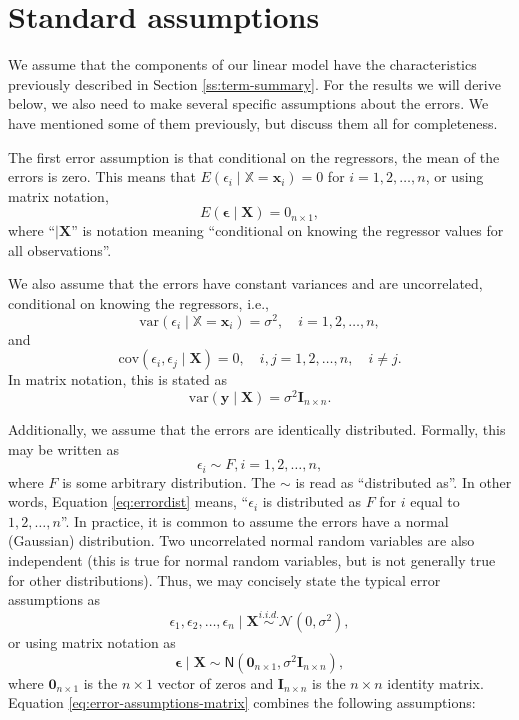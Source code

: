 \documentclass[
]{book}
\theoremstyle{definition}
\theoremstyle{definition}
\theoremstyle{definition}
\theoremstyle{definition}
\theoremstyle{remark}
\begin{document}
\hypertarget{standard-assumptions}{%
\section{Standard assumptions}\label{standard-assumptions}}

We assume that the components of our linear model have the characteristics previously described in Section \ref{ss:term-summary}. For the results we will derive below, we also need to make several specific assumptions about the errors. We have mentioned some of them previously, but discuss them all for completeness.

The first error assumption is that conditional on the regressors, the mean of the errors is zero. This means that \(E(\epsilon_i \mid \mathbb{X} = \mathbf{x}_i)=0\) for \(i=1,2,\ldots,n\), or using matrix notation,
\[
E(\boldsymbol{\epsilon}\mid \mathbf{X}) = 0_{n\times 1},
\]
where ``\(\mid \mathbf{X}\)'' is notation meaning ``conditional on knowing the regressor values for all observations''.

We also assume that the errors have constant variances and are uncorrelated, conditional on knowing the regressors, i.e.,
\[\mathrm{var}(\epsilon_i\mid \mathbb{X}=\mathbf{x}_i) = \sigma^2, \quad i=1,2,\ldots,n,\]
and
\[
\mathrm{cov}(\epsilon_i, \epsilon_j\mid \mathbf{X}) = 0, \quad i,j=1,2,\ldots,n,\quad i\neq j.
\]
In matrix notation, this is stated as
\[
\mathrm{var}(\mathbf{y} \mid {\mathbf{X}})=\sigma^2\mathbf{I}_{n\times n}.
\]

Additionally, we assume that the errors are identically distributed. Formally, this may be written as
\[
\epsilon_i \sim F, i=1,2,\ldots,n,
\label{eq:errordist}
\]
where \(F\) is some arbitrary distribution. The \(\sim\) is read as ``distributed as''. In other words, Equation \eqref{eq:errordist} means, ``\(\epsilon_i\) is distributed as \(F\) for \(i\) equal to \(1,2,\ldots,n\)''. In practice, it is common to assume the errors have a normal (Gaussian) distribution. Two uncorrelated normal random variables are also independent (this is true for normal random variables, but is not generally true for other distributions). Thus, we may concisely state the typical error assumptions as
\[
\epsilon_1,\epsilon_2,\ldots,\epsilon_n \mid \mathbf{X}\stackrel{i.i.d.}{\sim} \mathcal{N}(0, \sigma^2),
\]
or using matrix notation as
\[
\boldsymbol{\epsilon}\mid \mathbf{X}\sim \mathsf{N}(\mathbf{0}_{n\times 1},\sigma^2 \mathbf{I}_{n\times n}), \label{eq:error-assumptions-matrix}
\]
where \(\mathbf{0}_{n\times 1}\) is the \(n \times 1\) vector of zeros and \(\mathbf{I}_{n\times n}\) is the \(n\times n\) identity matrix. Equation \eqref{eq:error-assumptions-matrix}
combines the following assumptions:
\end{document}
